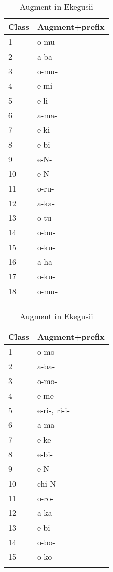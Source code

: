 \documentclass[output=paper]{langscibook}
\begin{document}
\begin{table}
\caption{Augments in Haya and Ekegusii\label{hayagusii8}}
\begin{subtable}[t]{.5\textwidth}\centering
\caption{Augment in Haya\label{hayagusii8:a}}
\begin{tabular}{ll}
\lsptoprule
Class &	Augment+prefix\\\midrule
1  &	o-mu-\\        
2  &	a-ba-\\        
3  &	o-mu-\\        
4  &	e-mi-\\        
5  &	e-li-\\        
6  &	a-ma-\\        
7  &	e-ki-\\        
8  &	e-bi-\\        
9  &	e-N-\\        
10 &	e-N-\\        
11 &	o-ru-\\        
12 &    a-ka-\\        
13 &	o-tu-\\        
14 &	o-bu-\\        
15 &	o-ku-\\        
16 &	a-ha-\\        
17 &	o-ku-\\        
18 &	o-mu-\\        
\lspbottomrule
\end{tabular}
\end{subtable}\begin{subtable}[t]{.5\textwidth}\centering
\caption{Augment in Ekegusii\label{hayagusii8:b}}
\begin{tabular}{ll}
\lsptoprule
 Class	&	Augment+prefix \\\midrule
   1	&	o-mo- \\
   2	&	a-ba- \\
   3	&	o-mo- \\
   4	&	e-me- \\
   5	&	e-ri-, ri-i- \\
   6	&	a-ma-\\
   7	&	e-ke-\\
   8	&	e-bi- \\
   9	&	e-N- \\
   10	&	chi-N- \\
   11	&	o-ro- \\
   12	&	a-ka- \\
   13	&	e-bi- \\
   14	&	o-bo- \\
   15	&	o-ko- \\
\lspbottomrule
\end{tabular}
\end{subtable}
\end{table}
\end{document}
